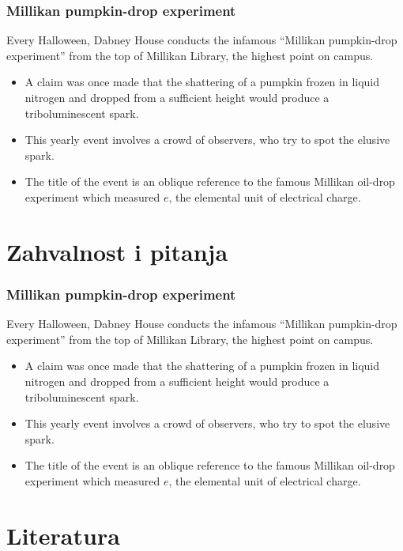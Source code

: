 \documentclass[hyperref={bookmarks=false},aspectratio=169]{beamer}
\begin{document}
\begin{frame}
\frametitle{Millikan pumpkin-drop experiment}
Every Halloween, Dabney House conducts the infamous ``Millikan pumpkin-drop experiment'' from the top of Millikan Library, the highest point on campus.

\begin{itemize}
    \item A claim was once made that the shattering of a pumpkin frozen in liquid nitrogen and dropped from a sufficient height would produce a triboluminescent spark. 
    \item This yearly event involves a crowd of observers, who try to spot the elusive spark.
    \item The title of the event is an oblique reference to the famous Millikan oil-drop experiment which measured $e$, the elemental unit of electrical charge.
\end{itemize}

\end{frame}

\section{Zahvalnost i pitanja}

\begin{frame}
\frametitle{Millikan pumpkin-drop experiment}
Every Halloween, Dabney House conducts the infamous ``Millikan pumpkin-drop experiment'' from the top of Millikan Library, the highest point on campus.

\begin{itemize}
    \item A claim was once made that the shattering of a pumpkin frozen in liquid nitrogen and dropped from a sufficient height would produce a triboluminescent spark. 
    \item This yearly event involves a crowd of observers, who try to spot the elusive spark.
    \item The title of the event is an oblique reference to the famous Millikan oil-drop experiment which measured $e$, the elemental unit of electrical charge.
\end{itemize}

\end{frame}

\section{Literatura}
\end{document}
